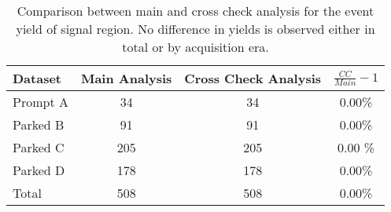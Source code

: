 \begin{table}[!htp]
\centering

\begin{tabular}{|l|c|c|c|}
\hline
Dataset & Main Analysis & Cross Check Analysis & $\frac{CC}{Main}-1$ \\ 
\hline \hline
Prompt A &  34 &  34 & 0.00\% \\
Parked B &  91 &  91 & 0.00\% \\
Parked C & 205 & 205 & 0.00 \% \\
Parked D & 178 & 178 & 0.00\% \\
\hline \hline
Total & 508 & 508 & 0.00\% \\
\hline
\end{tabular}

\caption{Comparison between main and cross check analysis for the event yield of signal region. No difference in yields is observed either in total or by acquisition era.}
\end{table}
